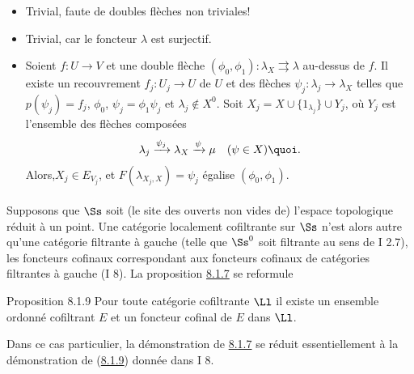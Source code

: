 \begin{itemize}
\item[(iii) \emph{axiome} $(\Ll3)$] Trivial, faute de doubles
  flèches non triviales!

\item[(iv) \emph{axiome} $(C \mathfrak{F} 1)$] Trivial, car le foncteur
  $\lambda$ est surjectif.

\item[((v) \emph{axiome} $(C \mathfrak{F} 2)$] Soient $f : U \to V$ et
 une double
 flèche $(\phi_{0}, \phi_{1}) : \lambda_X \rightrightarrows \lambda$
 au-dessus de $f$. Il existe un recouvrement $f_j : U_j \to U$ de $U$
 et des flèches $\psi_j : \lambda_j \to \lambda_X$ telles que
 $p(\psi_j) = f_j$, $\phi_{0}$, $\psi_j = \phi_1 \psi_j$ et $\lambda_j
 \not\in X^{0}$. Soit $X_j = X \cup \{1_{\lambda_{j}}\} \cup
 Y_j$, où $Y_j$ est l'ensemble des flèches composées
$$
\lambda_j \xrightarrow[]{\psi_j} \lambda_X \xrightarrow{\psi} \mu\quad
(\psi \in X){\quoi}.
$$
Alors,\pageoriginale $X_j \in E_{V_{j}}$, et $F(\lambda_{X_{j}, X}) = \psi_j$
égalise $(\phi_0, \phi_1)$.
\end{itemize}

\setcounter{subsubsection}{9}
\setcounter{paragraph}{-1}
\paragraph{}

Supposons que $\Ss$ soit (le site des ouverts non vides de) l'espace
topologique réduit à un point. Une catégorie localement
cofiltrante sur $\Ss$ n'est alors autre qu'une catégorie filtrante à
gauche (\ie telle que $\Ss^{0}$ soit filtrante au sens de I 2.7),
les foncteurs cofinaux correspondant aux foncteurs cofinaux de
catégories filtrantes à gauche (I 8). La proposition \hyperref[V.prop8.1.7]{8.1.7} se
reformule

\begin{enonce*}{Proposition 8.1.9}
Pour toute catégorie cofiltrante $\Ll$ il existe un ensemble ordonné
cofiltrant $E$ et un foncteur cofinal de $E$ dans $\Ll$.
\end{enonce*}

Dans ce cas particulier, la démonstration de \hyperref[V.prop8.1.7]{8.1.7} se réduit
essentiellement à la démonstration de (\hyperref[V.prop8.1.9]{8.1.9}) donnée dans I 8.

